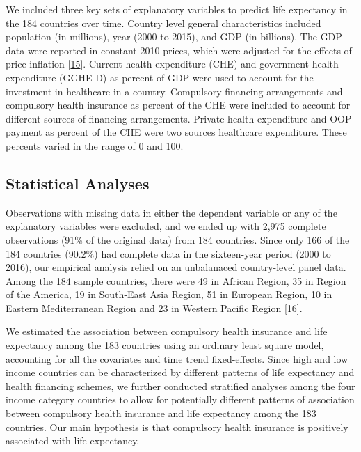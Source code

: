 \documentclass[]{elsarticle} %
\begin{document}
We included three key sets of explanatory variables to predict life expectancy in the 184 countries over time.
Country level general characteristics included population (in millions), year (2000 to 2015), and GDP (in billions).
The GDP data were reported in constant 2010 prices, which were adjusted for the effects of price inflation {[}\protect\hyperlink{ref-worldbankconstant}{15}{]}.
Current health expenditure (CHE) and government health expenditure (GGHE-D) as percent of GDP were used to account for the investment in healthcare in a country.
Compulsory financing arrangements and compulsory health insurance as percent of the CHE were included to account for different sources of financing arrangements.
Private health expenditure and OOP payment as percent of the CHE were two sources healthcare expenditure.
These percents varied in the range of 0 and 100.

\hypertarget{statistical-analyses}{%
\subsection{Statistical Analyses}\label{statistical-analyses}}

Observations with missing data in either the dependent variable or any of the explanatory variables were excluded, and we ended up with 2,975 complete observations (91\% of the original data) from 184 countries.
Since only 166 of the 184 countries (90.2\%) had complete data in the sixteen-year period (2000 to 2016), our empirical analysis relied on an unbalanaced country-level panel data.
Among the 184 sample countries, there were 49 in African Region, 35 in Region of the America, 19 in South-East Asia Region, 51 in European Region, 10 in Eastern Mediterranean Region and 23 in Western Pacific Region {[}\protect\hyperlink{ref-WHOregion}{16}{]}.

We estimated the association between compulsory health insurance and life expectancy among the 183 countries using an ordinary least square model, accounting for all the covariates and time trend fixed-effects.
Since high and low income countries can be characterized by different patterns of life expectancy and health financing schemes, we further conducted stratified analyses among the four income category countries to allow for potentially different patterns of association between compulsory health insurance and life expectancy among the 183 countries.
Our main hypothesis is that compulsory health insurance is positively associated with life expectancy.
\end{document}
